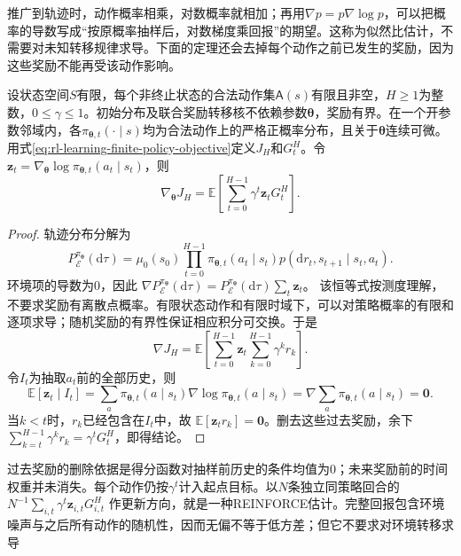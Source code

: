 推广到轨迹时，动作概率相乘，对数概率就相加；再用$\nabla p=p\nabla\log p$，可以把概率的导数写成“按原概率抽样后，对数梯度乘回报”的期望。这称为似然比估计，不需要对未知转移规律求导。下面的定理还会去掉每个动作之前已发生的奖励，因为这些奖励不能再受该动作影响。

\begin{theorem}[有限时域似然比策略梯度]
  \label{thm:rl-learning-likelihood-gradient}
  设状态空间$S$有限，每个非终止状态的合法动作集$\mathsf A(s)$有限且非空，$H\geq1$为整数，$0\leq\gamma\leq1$。初始分布及联合奖励转移核不依赖参数$\bm\theta$，奖励有界。在一个开参数邻域内，各$\pi_{\bm\theta,t}(\cdot\mid s)$均为合法动作上的严格正概率分布，且关于$\bm\theta$连续可微。用式\eqref{eq:rl-learning-finite-policy-objective}定义$J_H$和$G_t^H$。令
  $\bm z_t=\nabla_{\bm\theta}\log\pi_{\bm\theta,t}(a_t\mid s_t)$，则
  \begin{equation}
    \nabla_{\bm\theta}J_H
       =\mathbb E\left[
          \sum_{t=0}^{H-1}\gamma^t\bm{z}_tG_t^H\right].
    \label{eq:rl-learning-reward-to-go}
  \end{equation}
\end{theorem}
\begin{proof}
  轨迹分布分解为
  \[
    P_{\mathcal E}^{\pi_{\bm\theta}}(\mathrm d\tau)=\mu_0(s_0)
       \prod_{t=0}^{H-1}
       \pi_{\bm\theta,t}(a_t\mid s_t)
       p(\mathrm dr_t,s_{t+1}\mid s_t,a_t).
  \]
  环境项的导数为0，因此
  $\nabla P_{\mathcal E}^{\pi_{\bm\theta}}(\mathrm d\tau)
  =P_{\mathcal E}^{\pi_{\bm\theta}}(\mathrm d\tau)\sum_t\bm{z}_t$。
  该恒等式按测度理解，不要求奖励有离散点概率。有限状态动作和有限时域下，可以对策略概率的有限和逐项求导；随机奖励的有界性保证相应积分可交换。于是
  \[
    \nabla J_H
      =\mathbb E\left[
        \sum_{t=0}^{H-1}\bm{z}_t
        \sum_{k=0}^{H-1}\gamma^k r_k\right].
  \]
  令$I_t$为抽取$a_t$前的全部历史，则
  \[
    \mathbb E[\bm{z}_t\mid I_t]
       =\sum_a\pi_{\bm\theta,t}(a\mid s_t)
          \nabla\log\pi_{\bm\theta,t}(a\mid s_t)
       =\nabla\sum_a\pi_{\bm\theta,t}(a\mid s_t)=\bm0.
  \]
  当$k<t$时，$r_k$已经包含在$I_t$中，故
  $\mathbb E[\bm{z}_t r_k]=\bm0$。删去这些过去奖励，余下
  $\sum_{k=t}^{H-1}\gamma^k r_k=\gamma^tG_t^H$，即得结论。
\end{proof}

过去奖励的删除依据是得分函数对抽样前历史的条件均值为0；未来奖励前的时间权重并未消失。每个动作仍按$\gamma^t$计入起点目标。以$N$条独立同策略回合的
$N^{-1}\sum_{i,t}\gamma^t\bm{z}_{i,t}G_{i,t}^H$
作更新方向，就是一种REINFORCE估计。完整回报包含环境噪声与之后所有动作的随机性，因而无偏不等于低方差；但它不要求对环境转移求导

